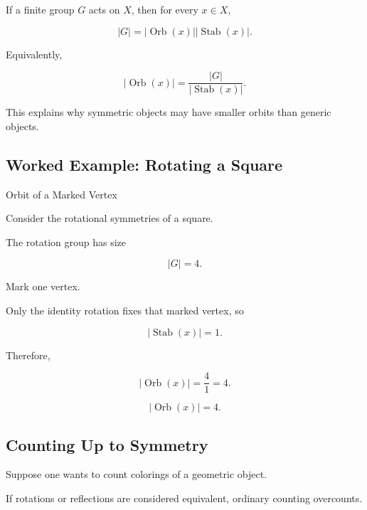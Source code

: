 \begin{theorem}
If a finite group \(G\) acts on \(X\), then for every \(x\in X\),

\[
\boxed{
|G|
=
|\operatorname{Orb}(x)|
|\operatorname{Stab}(x)|.
}
\]
\end{theorem}

Equivalently,

\[
\boxed{
|\operatorname{Orb}(x)|
=
\frac{|G|}{|\operatorname{Stab}(x)|}.
}
\]

This explains why symmetric objects may have smaller orbits than
generic objects.

\subsection{Worked Example: Rotating a Square}
\label{subsec:worked-square-orbit}

\begin{workedexamplebox}{Orbit of a Marked Vertex}

Consider the rotational symmetries of a square.

The rotation group has size

\[
|G|=4.
\]

Mark one vertex.

Only the identity rotation fixes that marked vertex, so

\[
|\operatorname{Stab}(x)|=1.
\]

Therefore,

\[
|\operatorname{Orb}(x)|
=
\frac41
=
4.
\]

\begin{answerbox}
\[
\boxed{
|\operatorname{Orb}(x)|=4.
}
\]
\end{answerbox}

\end{workedexamplebox}

\subsection{Counting Up to Symmetry}
\label{subsec:counting-up-to-symmetry}

Suppose one wants to count colorings of a geometric object.

If rotations or reflections are considered equivalent, ordinary
counting overcounts.

